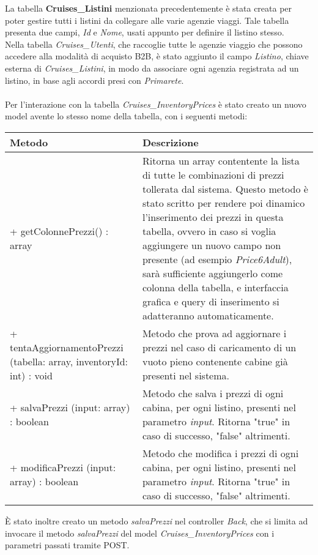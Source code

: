 La tabella \textbf{Cruises\_Listini} menzionata precedentemente è stata creata per poter gestire tutti i listini da collegare alle varie agenzie viaggi. Tale tabella presenta due campi, \textit{Id} e \textit{Nome}, usati appunto per definire il listino stesso. \\
Nella tabella \textit{Cruises\_Utenti}, che raccoglie tutte le agenzie viaggio che possono accedere alla modalità di acquisto B2B, è stato aggiunto il campo \textit{Listino}, chiave esterna di \textit{Cruises\_Listini}, in modo da associare ogni agenzia registrata ad un listino, in base agli accordi presi con \textit{Primarete}. \\ \\
Per l'interazione con la tabella \textit{Cruises\_InventoryPrices} è stato creato un nuovo model avente lo stesso nome della tabella, con i seguenti metodi: 
\begin{center}
	\def\arraystretch{1.5}
	\begin{longtable}{ >{\raggedright}p{5.5cm} p{6.8cm}} 
		\hline
		\textbf{Metodo} & \textbf{Descrizione} \\ \hline
		+ getColonnePrezzi() : array & Ritorna un array contentente la lista di tutte le combinazioni di prezzi tollerata dal sistema. Questo metodo è stato scritto per rendere poi dinamico l'inserimento dei prezzi in questa tabella, ovvero in caso si voglia aggiungere un nuovo campo non presente (ad esempio \textit{Price6Adult}), sarà sufficiente aggiungerlo come colonna della tabella, e interfaccia grafica e query di inserimento si adatteranno automaticamente. \\
		\hline
		+ tentaAggiornamentoPrezzi (tabella: array, inventoryId: int) : void & Metodo che prova ad aggiornare i prezzi nel caso di caricamento di un vuoto pieno contenente cabine già presenti nel sistema.\\
		\hline
		+ salvaPrezzi (input: array) : boolean & Metodo che salva i prezzi di ogni cabina, per ogni listino, presenti nel parametro \textit{input}. Ritorna "true" in caso di successo, "false" altrimenti.\\
		\hline
		+ modificaPrezzi (input: array) : boolean & Metodo che modifica i prezzi di ogni cabina, per ogni listino, presenti nel parametro \textit{input}. Ritorna "true" in caso di successo, "false" altrimenti.\\
		\hline
	\end{longtable}
\end{center}
È stato inoltre creato un metodo \textit{salvaPrezzi} nel controller \textit{Back}, che si limita ad invocare il metodo \textit{salvaPrezzi} del model \textit{Cruises\_InventoryPrices} con i parametri passati tramite POST.\\
